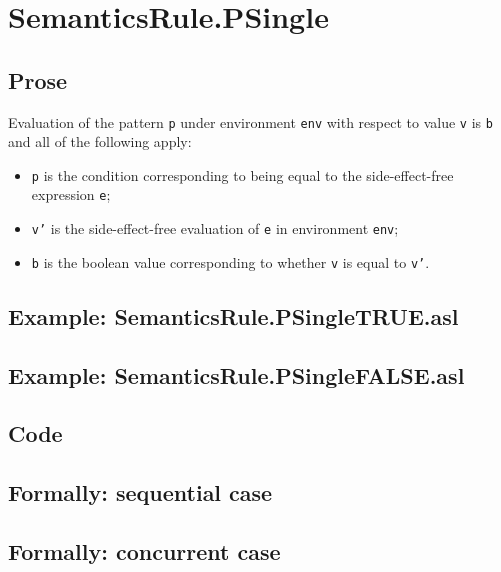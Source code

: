 \documentclass{book}
\begin{document}

\section{SemanticsRule.PSingle \label{sec:SemanticsRule.PSingle}}

    \subsection{Prose}
  Evaluation of the pattern \texttt{p} under environment \texttt{env} with
  respect to value \texttt{v} is \texttt{b} and all of the following apply:
    \begin{itemize}
      \item \texttt{p} is the condition corresponding to being equal to the
        side-effect-free expression \texttt{e};
      \item \texttt{v'} is the side-effect-free evaluation of \texttt{e} in
        environment \texttt{env};
      \item \texttt{b} is the boolean value corresponding to whether \texttt{v}
        is equal to \texttt{v'}.
    \end{itemize}

    \subsection{Example: SemanticsRule.PSingleTRUE.asl}

    \subsection{Example: SemanticsRule.PSingleFALSE.asl}

  \subsection{Code}

\begin{emptyformal}
  \subsection{Formally: sequential case}

  \subsection{Formally: concurrent case}
\end{emptyformal}
\end{document}
